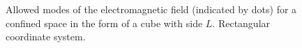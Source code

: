 \begin{figure}
\centering

\caption{Allowed modes of the electromagnetic field (indicated by dots) for a confined
  space in the form of a cube with side $L$. Rectangular
  coordinate system.}
\label{figCh1_pic3}
\end{figure}